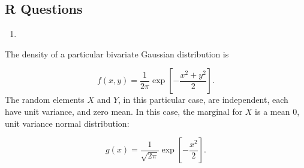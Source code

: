 \documentclass[
  12pt,
  krantz2]{krantz}
\providecommand{\tightlist}{%
  \setlength{\itemsep}{0pt}\setlength{\parskip}{0pt}}
\begin{document}
\hypertarget{r-questions-11}{%
\subsection{R Questions}\label{r-questions-11}}

\begin{enumerate}
\def\labelenumi{\arabic{enumi}.}
\tightlist
\item
\end{enumerate}

The density of a particular bivariate Gaussian distribution is

\[
f(x,y) = \frac{1}{2 \pi}  \exp\left[ -\frac{x ^2 + y^2}{2}     \right] \tag{1}.
\]
The random elements \(X\) and \(Y\), in this particular case, are independent, each have unit variance, and zero mean. In this case, the marginal for \(X\) is a mean \(0\), unit variance normal distribution:

\[
g(x) = \frac{1}{\sqrt{2\pi}} \exp\left[ -\frac{x ^2 }{2}     \right] \tag{2}.
\]
\end{document}
